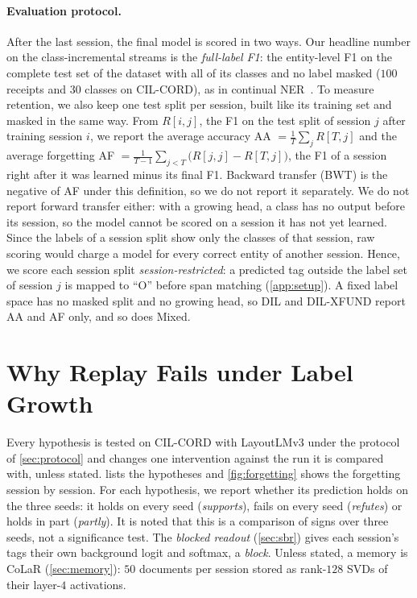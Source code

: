 \documentclass[10pt,twocolumn,letterpaper]{article}
\begin{document}
\paragraph{Evaluation protocol.} After the last session, the final model is scored in two ways. Our headline number on the class-incremental streams is the \emph{full-label F1}: the entity-level F1 on the complete test set of the dataset with all of its classes and no label masked ($100$ receipts and $30$ classes on CIL-CORD), as in continual NER~\citep{ma2023learning}. To measure retention, we also keep one test split per session, built like its training set and masked in the same way. From $R[i,j]$, the F1 on the test split of session $j$ after training session $i$, we report the average accuracy AA $=\tfrac1T\sum_j R[T,j]$ and the average forgetting AF $=\tfrac1{T-1}\sum_{j<T}\big(R[j,j]-R[T,j]\big)$, the F1 of a session right after it was learned minus its final F1. Backward transfer (BWT) is the negative of AF under this definition, so we do not report it separately. We do not report forward transfer either: with a growing head, a class has no output before its session, so the model cannot be scored on a session it has not yet learned. Since the labels of a session split show only the classes of that session, raw scoring would charge a model for every correct entity of another session. Hence, we score each session split \emph{session-restricted}: a predicted tag outside the label set of session $j$ is mapped to ``O'' before span matching (\cref{app:setup}). A fixed label space has no masked split and no growing head, so DIL and DIL-XFUND report AA and AF only, and so does Mixed.

\section{Why Replay Fails under Label Growth}
\label{sec:investigation}
Every hypothesis is tested on CIL-CORD with LayoutLMv3 under the protocol of \cref{sec:protocol} and changes one intervention against the run it is compared with, unless stated.  lists the hypotheses and \cref{fig:forgetting} shows the forgetting session by session. For each hypothesis, we report whether its prediction holds on the three seeds: it holds on every seed (\emph{supports}), fails on every seed (\emph{refutes}) or holds in part (\emph{partly}). It is noted that this is a comparison of signs over three seeds, not a significance test. The \emph{blocked readout} (\cref{sec:sbr}) gives each session's tags their own background logit and softmax, a \emph{block}. Unless stated, a memory is CoLaR (\cref{sec:memory}): $50$ documents per session stored as rank-$128$ SVDs of their layer-$4$ activations.
\end{document}
